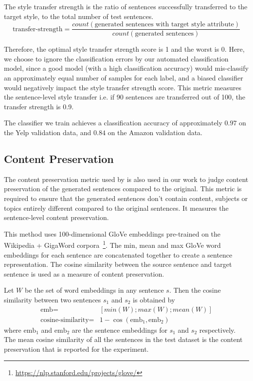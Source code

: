 The style transfer strength is the ratio of sentences successfully transferred to the target style, to the total number of test sentences.
\begin{equation*}
	\text{transfer-strength} = \frac{count(\text{generated sentences with target style attribute})}{count(\text{generated sentences})}
\end{equation*}

Therefore, the optimal style transfer strength score is 1 and the worst is 0. Here, we choose to ignore the classification errors by our automated classification model, since a good model (with a high classification accuracy) would mis-classify an approximately equal number of samples for each label, and a biased classifier would negatively impact the style transfer strength score. This metric measures the sentence-level style transfer i.e. if 90 sentences are transferred out of 100, the transfer strength is 0.9.

The classifier we train achieves a classification accuracy of approximately $0.97$ on the Yelp validation data, and $0.84$ on the Amazon validation data.

\subsection{Content Preservation} \label{ssec:content-preservation-metric}

The content preservation metric used by \cite{fu2017style} is also used in our work to judge content preservation of the generated sentences compared to the original. This metric is required to ensure that the generated sentences don't contain content, subjects or topics entirely different compared to the original sentences. It measures the sentence-level content preservation.

This method uses 100-dimensional GloVe embeddings \citep{pennington2014glove} pre-trained on the Wikipedia + GigaWord corpora~\footnote{\url{https://nlp.stanford.edu/projects/glove/}}. The min, mean and max GloVe word embeddings for each sentence are concatenated together to create a sentence representation. The cosine similarity between the source sentence and target sentence is used as a measure of content preservation.

Let $W$ be the set of word embeddings in any sentence $s$. Then the cosine similarity between two sentences $s_1$ and $s_2$ is obtained by
\begin{align*}
	\text{emb} =
	 & [min(W);max(W);mean(W)]              \\
	\text{cosine-similarity} =
	 & 1 - \cos(\text{emb}_1, \text{emb}_2)
\end{align*}
where $\text{emb}_1$ and $\text{emb}_2$ are the sentence embeddings for $s_1$ and $s_2$ respectively. The mean cosine similarity of all the sentences in the test dataset is the content preservation that is reported for the experiment.

